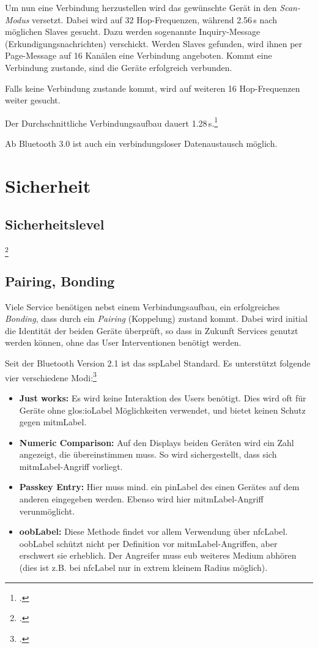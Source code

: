 Um nun eine Verbindung herzustellen wird das gewünschte Gerät in den \textit{Scan-Modus} versetzt. Dabei wird auf 32 Hop-Frequenzen, während 2.56\,s nach möglichen Slaves gesucht. Dazu werden sogenannte Inquiry-Message (Erkundigungsnachrichten) verschickt. Werden Slaves gefunden, wird ihnen per Page-Message  auf 16 Kanälen eine Verbindung angeboten. Kommt eine Verbindung zustande, sind die Geräte erfolgreich verbunden.

Falls keine Verbindung zustande kommt, wird auf weiteren 16 Hop-Frequenzen weiter gesucht.

Der Durchschnittliche Verbindungsaufbau dauert 1.28\,s.\footcite{Bluetooth_de_Wikipedia_2015-04-18}

Ab Bluetooth 3.0 ist auch ein verbindungsloser Datenaustausch möglich.


\section{Sicherheit}

\subsection{Sicherheitslevel}
\footcite{Bluetooth_de_Wikipedia_2015-04-18}

\subsection{Pairing, Bonding}
Viele Service benötigen nebst einem Verbindungsaufbau, ein erfolgreiches \textit{Bonding}, dass durch ein \textit{Pairing} (Koppelung) zustand kommt.
Dabei wird initial die Identität der beiden Geräte überprüft, so dass in Zukunft Services genutzt werden können, ohne das User Interventionen benötigt werden.

Seit der Bluetooth Version 2.1 ist das \gls{sspLabel} Standard. Es unterstützt folgende vier verschiedene Modi:\footcite{Bluetooth_Wikipedia_2015-04-17}
\begin{itemize}
	\item \textbf{Just works:} Es wird keine Interaktion des Users benötigt. Dies wird oft für Geräte ohne \gls{glos:ioLabel} Möglichkeiten verwendet, und bietet keinen Schutz gegen \gls{mitmLabel}.
	\item \textbf{Numeric Comparison:} Auf den Displays beiden Geräten wird ein Zahl angezeigt, die übereinstimmen muss. So wird sichergestellt, dass sich \gls{mitmLabel}-Angriff vorliegt.
	\item \textbf{Passkey Entry:} Hier muss mind. ein \gls{pinLabel} des einen Gerätes auf dem anderen eingegeben werden. Ebenso wird hier \gls{mitmLabel}-Angriff verunmöglicht.
	\item \textbf{\gls{oobLabel}:} Diese Methode findet vor allem Verwendung über \gls{nfcLabel}. \gls{oobLabel} schützt nicht per Definition vor \gls{mitmLabel}-Angriffen, aber erschwert sie erheblich. Der Angreifer muss eub weiteres Medium abhören (dies ist z.B. bei \gls{nfcLabel} nur in extrem kleinem Radius möglich).
\end{itemize}



